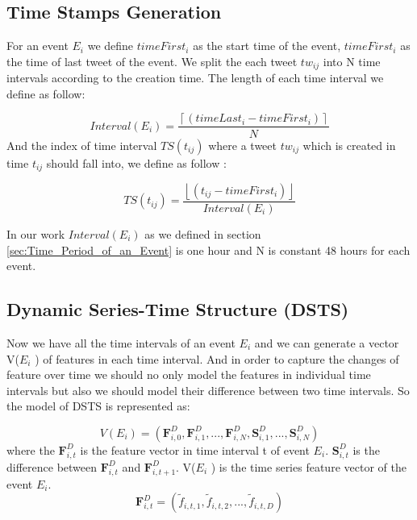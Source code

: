    \subsection{Time Stamps Generation} 
   For an event $E_i$ we define $timeFirst_i$ as the start time of the event, $timeFirst_i$ as the time of last tweet of the event. We split the each tweet $tw_{ij}$ into N time intervals according to the creation time. The length of each time interval we define as follow: 
   
\begin{equation}
Interval(E_i)=\frac{\left \lceil { (timeLast_i-timeFirst_i) }\right \rceil}{N}
\end{equation}
And the index of time interval $TS(t_{ij})$ where a tweet $tw_{ij}$ which is created in time $t_{ij}$ should fall into, we define as follow :

\begin{equation}
TS(t_{ij})=\frac{\left \lfloor { (t_{ij}-timeFirst_i) }\right \rfloor}{Interval(E_i)}
\end{equation}

In our work $Interval(E_i)$ as we defined in section \ref{sec:Time_Period_of_an_Event} is one hour and N is constant 48 hours for each event.  
   
   \subsection{ Dynamic Series-Time Structure (DSTS)} 
Now we have all the time intervals of an event $E_i$ and we can generate a vector V($E_i$ ) of features in each time interval. And in order to capture the changes of feature over time we should no only model the features in individual time intervals but also we should model their difference between two time intervals. So the model of  DSTS is represented as:  

\begin{equation}
 V(E_i)=(\textbf{F}^D_{i,0}, \textbf{F}^D_{i,1},..., \textbf{F}^D_{i,N},\textbf{S}^D_{i,1},..., \textbf{S}^D_{i,N})
\end{equation}
where the $\textbf{F}^D_{i,t}$ is the feature vector in time interval t of event $E_i$.  $\textbf{S}^D_{i,t}$ is the difference between $\textbf{F}^D_{i,t}$ and $\textbf{F}^D_{i,t+1}$. V($E_i$ ) is the time series feature vector of the event $E_i$.
\begin{equation}
\textbf{F}^D_{i,t}=(\widetilde{ f}_{i,t,1},\widetilde{ f}_{i,t,2},...,\widetilde{ f}_{i,t,D})
\end{equation}

